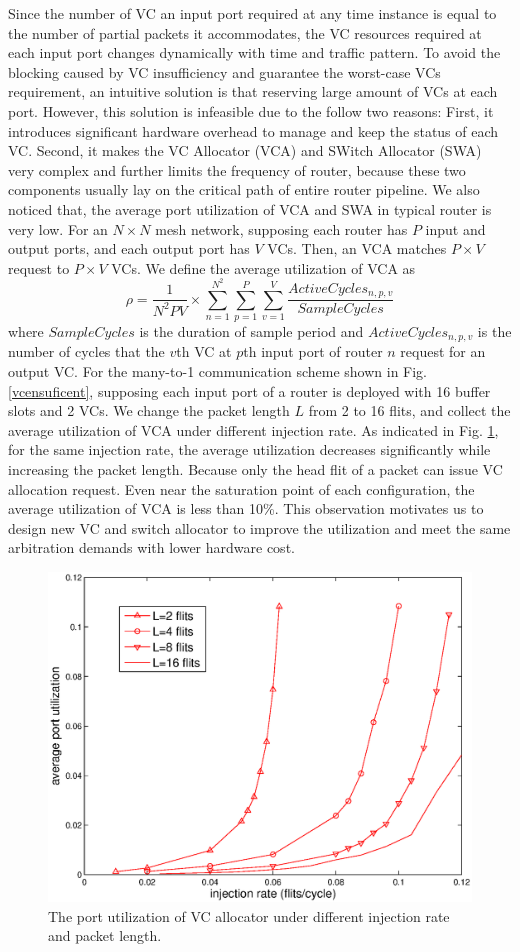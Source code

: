 \documentclass[10pt,conference]{IEEEtran}
\begin{document}
Since the number of VC an input port required at any time instance is equal to the number of partial packets it accommodates, the VC resources required at each input port changes dynamically with time and traffic pattern. To avoid the blocking caused by VC insufficiency and guarantee the worst-case VCs requirement, an intuitive solution is that reserving large amount of VCs at each port. However, this solution is infeasible due to the follow two reasons: First, it introduces significant hardware overhead to manage and keep the status of each VC. Second, it makes the VC Allocator (VCA) and SWitch Allocator (SWA) very complex and further limits the frequency of router, because these two components usually lay on the critical path of entire router pipeline. We also noticed that, the average port utilization of VCA and SWA in typical router is very low. For an $N\times N$ mesh network, supposing each router has $P$ input and output ports, and each output port has $V$ VCs. Then, an VCA matches $P\times V$ request to $P\times V$ VCs. We define the average utilization of VCA as
$$\rho=\frac{1}{N^2PV}\times \sum_{n=1}^{N^2}\sum_{p=1}^P\sum_{v=1}^V\frac{ActiveCycles_{n,p,v}}{SampleCycles}$$
where $SampleCycles$ is the duration of sample period and $ActiveCycles_{n,p,v}$ is the number of cycles that the $v$th VC at $p$th input port of router $n$ request for an output VC. For the many-to-1 communication scheme shown in Fig. \ref{vcensuficent}, supposing each input port of a router is deployed with 16 buffer slots and 2 VCs. We change the packet length $L$ from 2 to 16 flits, and collect the average utilization of VCA under different injection rate. As indicated in Fig. \ref{utilization}, for the same injection rate, the average utilization decreases significantly while increasing the packet length. Because only the head flit of a packet can issue VC allocation request. Even near the saturation point of each configuration, the average utilization of VCA is less than 10\%. This observation motivates us to design new VC and switch allocator to improve the utilization and meet the same arbitration demands with lower hardware cost.
\begin{figure}
\centering\includegraphics[scale=0.5]{figures/util.eps}
\caption{The port utilization of VC allocator under different injection rate and packet length.}\label{utilization}
\end{figure}
\end{document}
